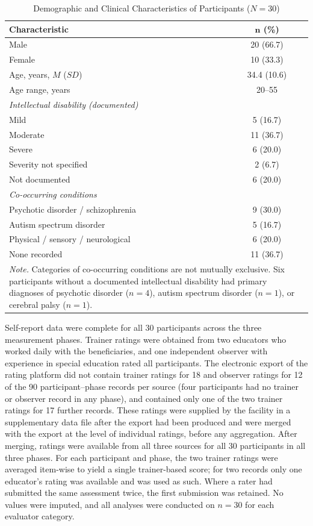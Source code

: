 \documentclass[12pt,a4paper]{article}
\begin{document}
\begin{table}[!t]
\caption{Demographic and Clinical Characteristics of Participants ($N = 30$)}
\label{tab:demographics}
\centering
\begin{tabular}{lc}
\hline
\textbf{Characteristic} & $\boldsymbol{n}$ \textbf{(\%)} \\
\hline
Male & 20 (66.7) \\
Female & 10 (33.3) \\
Age, years, $M$ ($SD$) & 34.4 (10.6) \\
Age range, years & 20--55 \\
\hline
\multicolumn{2}{l}{\textit{Intellectual disability (documented)}} \\
\quad Mild & 5 (16.7) \\
\quad Moderate & 11 (36.7) \\
\quad Severe & 6 (20.0) \\
\quad Severity not specified & 2 (6.7) \\
\quad Not documented & 6 (20.0) \\
\hline
\multicolumn{2}{l}{\textit{Co-occurring conditions}} \\
\quad Psychotic disorder / schizophrenia & 9 (30.0) \\
\quad Autism spectrum disorder & 5 (16.7) \\
\quad Physical / sensory / neurological & 6 (20.0) \\
\quad None recorded & 11 (36.7) \\
\hline
\multicolumn{2}{p{0.85\linewidth}}{\footnotesize\textit{Note.} Categories of co-occurring conditions are not mutually exclusive. Six participants without a documented intellectual disability had primary diagnoses of psychotic disorder ($n = 4$), autism spectrum disorder ($n = 1$), or cerebral palsy ($n = 1$).} \\
\end{tabular}
\end{table}

Self-report data were complete for all 30 participants across the three measurement phases. Trainer ratings were obtained from two educators who worked daily with the beneficiaries, and one independent observer with experience in special education rated all participants. The electronic export of the rating platform did not contain trainer ratings for 18 and observer ratings for 12 of the 90 participant--phase records per source (four participants had no trainer or observer record in any phase), and contained only one of the two trainer ratings for 17 further records. These ratings were supplied by the facility in a supplementary data file after the export had been produced and were merged with the export at the level of individual ratings, before any aggregation. After merging, ratings were available from all three sources for all 30 participants in all three phases. For each participant and phase, the two trainer ratings were averaged item-wise to yield a single trainer-based score; for two records only one educator's rating was available and was used as such. Where a rater had submitted the same assessment twice, the first submission was retained. No values were imputed, and all analyses were conducted on $n = 30$ for each evaluator category.
\end{document}
